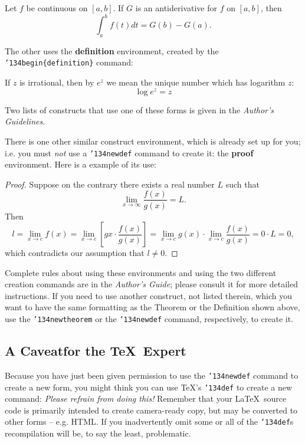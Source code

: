 \documentclass[acmtog, authorversion]{acmart}
\begin{document}
\begin{theorem}
Let $f$ be continuous on $[a,b]$.  If $G$ is an antiderivative for
$f$ on $[a,b]$, then
\begin{displaymath}\int^b_af(t)dt = G(b) - G(a).\end{displaymath}
\end{theorem}

The other uses the \textbf{definition} environment, created by the
\texttt{{\char'134}begin\{definition\}} command:
\begin{definition}
If $z$ is irrational, then by $e^z$ we mean the unique number
which has logarithm $z$: \begin{displaymath}{\log e^z =
z}\end{displaymath}
\end{definition}

Two lists of constructs that use one of these forms is given in
the \textit{Author's  Guidelines}.

There is one other similar construct environment, which is already
set up for you; i.e. you must \textit{not} use a
\texttt{{\char'134}newdef} command to create it: the
\textbf{proof} environment.  Here is a example of its use:
\begin{proof}
Suppose on the contrary there exists a real number $L$ such that
\begin{displaymath}
\lim_{x\rightarrow\infty} \frac{f(x)}{g(x)} = L.
\end{displaymath}
Then
\begin{displaymath}
l=\lim_{x\rightarrow c} f(x) = \lim_{x\rightarrow c} \left[ g{x}
\cdot \frac{f(x)}{g(x)} \right ] = \lim_{x\rightarrow c} g(x)
\cdot \lim_{x\rightarrow c} \frac{f(x)}{g(x)} = 0\cdot L = 0,
\end{displaymath}
which contradicts our assumption that $l\neq 0$.
\end{proof}

Complete rules about using these environments and using the two
different creation commands are in the \textit{Author's Guide};
please consult it for more detailed instructions.  If you need to
use another construct, not listed therein, which you want to have
the same formatting as the Theorem or the
Definition\cite{salas:calculus} shown above, use the
\texttt{{\char'134}newtheorem} or the \texttt{{\char'134}newdef}
command, respectively, to create it.

\subsection*{A Caveatfor the \TeX\ Expert}
Because you have just been given permission to use the
\texttt{{\char'134}newdef} command to create a new form, you might
think you can use \TeX's \texttt{{\char'134}def} to create a new
command: \textit{Please refrain from doing this!} Remember that
your \LaTeX\ source code is primarily intended to create
camera-ready copy, but may be converted to other forms -- e.g.
HTML. If you inadvertently omit some or all of the
\texttt{{\char'134}def}s recompilation will be, to say the least,
problematic.
\end{document}
